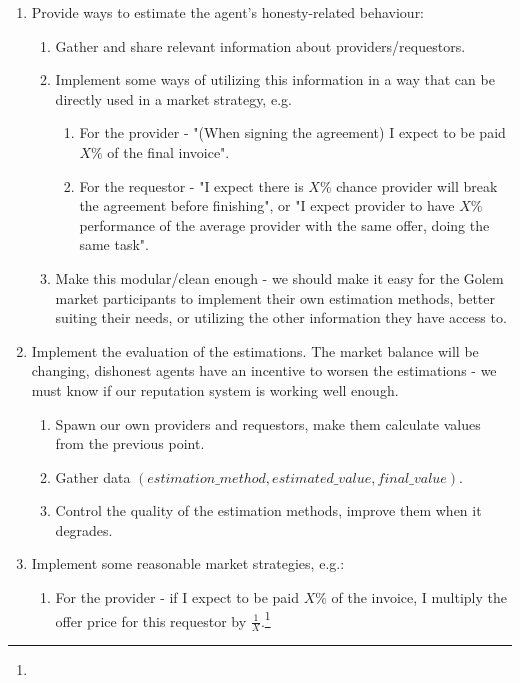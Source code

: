 \documentclass{article}
\begin{document}
\begin{enumerate}
    \item Provide ways to estimate the agent's honesty-related behaviour:
        \begin{enumerate}
            \item Gather and share relevant information about providers/requestors.
            \item Implement some ways of utilizing this information in a way that can be directly used in a market strategy, e.g.
                \begin{enumerate}
                    \item For the provider - "(When signing the agreement) I expect to be paid $X\%$ of the final invoice".
                    \item For the requestor - "I expect there is $X\%$ chance provider will break the agreement before finishing", 
                        or "I expect provider to have $X\%$ performance of the average provider with the same offer, doing the same task".
                \end{enumerate}
            \item Make this modular/clean enough - we should make it easy for the Golem market participants 
                to implement their own estimation methods, better suiting their needs, or utilizing the other information they have access to.
        \end{enumerate}
    \item Implement the evaluation of the estimations. The market balance will be changing, dishonest agents have an incentive
        to worsen the estimations - we must know if our reputation system is working well enough.
        \begin{enumerate}
            \item Spawn our own providers and requestors, make them calculate values from the previous point.
            \item Gather data $(estimation\_method, estimated\_value, final\_value)$.
            \item Control the quality of the estimation methods, improve them when it degrades.
        \end{enumerate}
    \item Implement some reasonable market strategies, e.g.:
        \begin{enumerate}
            \item For the provider - if I expect to be paid $X\%$ of the invoice, I multiply the offer price for this requestor by $\frac{1}{X}$.\footnote{
}
\end{enumerate}
\end{enumerate}
\end{document}
